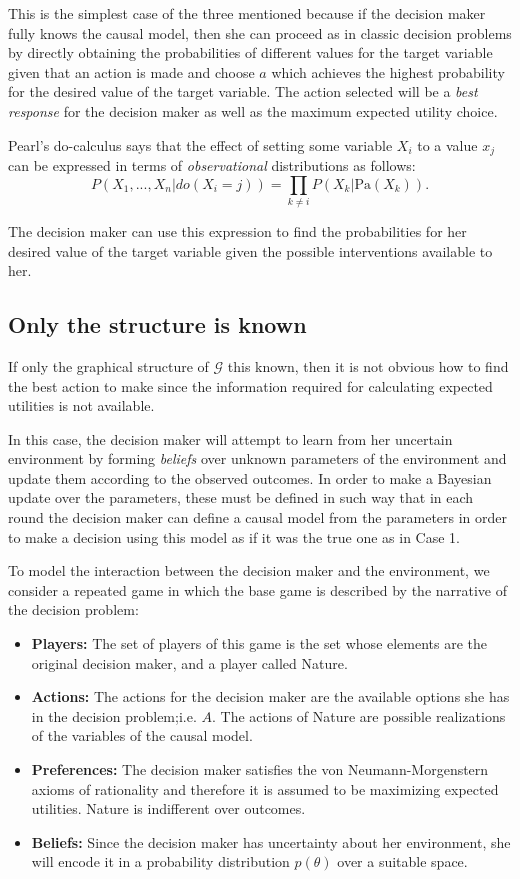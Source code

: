\documentclass{article}
\begin{document}
This is the simplest case of the three mentioned because if the decision maker fully knows the causal model, then she can proceed as in classic decision problems by directly obtaining the probabilities of different values for the target variable given that an action is made and choose $a$ which achieves the highest probability for the desired value of the target variable. The action selected will be a \textit{best response} for the decision maker as well as the maximum expected utility choice.

Pearl's do-calculus \cite{pearl2009causality} says that the effect of setting some variable $X_i$ to a value $x_j$ can be expressed in terms of \textit{observational} distributions as follows:
\[ P(X_1,...,X_n | do(X_i = j )) = \prod_{k \neq i} P(X_k | \textrm{Pa}(X_k)). \]

The decision maker can use this expression to find the probabilities for her desired value of the target variable given the possible interventions available to her.

\subsection{Only the structure is known}
If only the graphical structure of $\mathcal{G}$ this known, then it is not obvious how to find the best action to make since the information required for calculating expected utilities is not available.

In this case, the decision maker will attempt to learn from her uncertain environment by forming \textit{beliefs} over unknown parameters of the environment and update them according to the observed outcomes. In order to make a Bayesian update over the parameters, these must be defined in such way that in each round the decision maker can define a causal model from the parameters in order to make a decision using this model as if it was the true one as in Case 1.

To model the interaction between the decision maker and the environment, we consider a repeated game in which the base game is described by the narrative of the decision problem: 
\begin{itemize}
\item \textbf{Players:} The set of players of this game is the set whose elements are the original decision maker, and a player called Nature.
\item \textbf{Actions:} The actions for the decision maker are the available options she has in the decision problem;i.e. $A$. The actions of Nature are possible realizations of the variables of the causal model. 
\item \textbf{Preferences:} The decision maker satisfies the von Neumann-Morgenstern axioms of rationality and therefore it is assumed to be maximizing expected utilities. Nature is indifferent over outcomes.
\item \textbf{Beliefs:} Since the decision maker has uncertainty about her environment, she will encode it in a probability distribution $p(\theta)$ over a suitable space.
\end{itemize}
\end{document}
